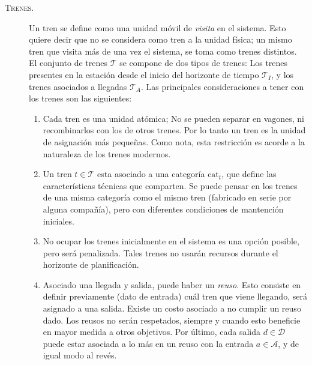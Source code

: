 \documentclass[letter, 10pt]{article}
\begin{document}
\begin{description}
    \item[\textsc{Trenes.}]
    Un tren se define como una unidad móvil de \textit{visita} en el sistema. Esto quiere decir que no se considera como tren
    a la unidad física; un mismo tren que visita más de una vez el sistema, se toma como trenes distintos. El conjunto de trenes $\mathcal{T}$ se compone de dos tipos de trenes: Los trenes presentes en la estación desde el inicio del horizonte de tiempo $\mathcal{T}_I$,  y los trenes asociados a llegadas $\mathcal{T}_A$.
    Las principales consideraciones a tener con los trenes son las siguientes:
    \begin{enumerate}
        \item Cada tren es una unidad atómica; No se pueden separar en vagones, ni recombinarlos con los de otros trenes. Por lo tanto un tren es la unidad de asignación más pequeñas. Como nota, esta restricción es acorde a la naturaleza de los trenes modernos.
        \item Un tren $t \in \mathcal{T}$ esta asociado a una categoría $\text{cat}_t$, que define las características técnicas que comparten. Se puede pensar en los trenes de una misma categoría como el mismo tren (fabricado en serie por alguna compañía), pero con diferentes condiciones de mantención iniciales.
        \item No ocupar los trenes inicialmente en el sistema es una opción posible, pero será penalizada. Tales trenes no usarán recursos durante el horizonte de planificación.
        \item Asociado una llegada y salida, puede haber un \textit{reuso}. Esto consiste en definir previamente (dato de entrada) cuál tren que viene llegando, será asignado a una salida. Existe un costo asociado a no cumplir un reuso dado. Los reusos no serán respetados, siempre y cuando esto beneficie en mayor medida a otros objetivos. Por último,
        cada salida $d \in \mathcal{D}$ puede estar asociada a lo más en un reuso con la entrada $a \in \mathcal{A}$, y de igual modo al revés.
    \end{enumerate}


\end{description}
\end{document}

